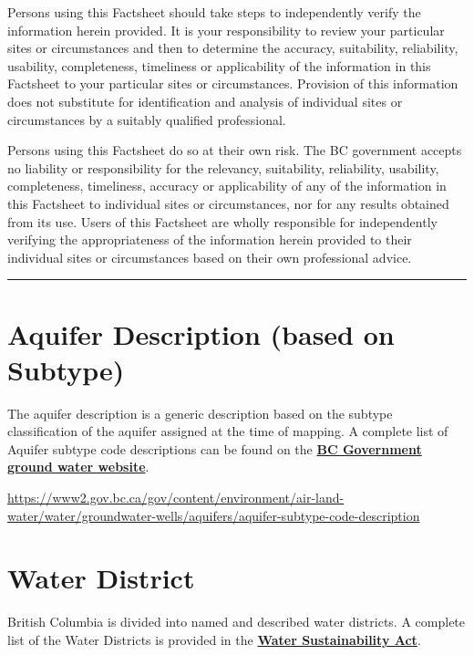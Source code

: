 \documentclass[11pt,]{article}
\let\oldhref\href
\renewcommand{\href}[2]{\oldhref{#1}{\bfseries#2}}
\begin{document}
Persons using this Factsheet should take steps to independently verify
the information herein provided. It is your responsibility to review
your particular sites or circumstances and then to determine the
accuracy, suitability, reliability, usability, completeness, timeliness
or applicability of the information in this Factsheet to your particular
sites or circumstances. Provision of this information does not
substitute for identification and analysis of individual sites or
circumstances by a suitably qualified professional.

Persons using this Factsheet do so at their own risk. The BC government
accepts no liability or responsibility for the relevancy, suitability,
reliability, usability, completeness, timeliness, accuracy or
applicability of any of the information in this Factsheet to individual
sites or circumstances, nor for any results obtained from its use. Users
of this Factsheet are wholly responsible for independently verifying the
appropriateness of the information herein provided to their individual
sites or circumstances based on their own professional advice.

\begin{center}\rule{0.5\linewidth}{\linethickness}\end{center}

\section{Aquifer Description (based on
Subtype)}\label{aquifer-description-based-on-subtype}

The aquifer description is a generic description based on the subtype
classification of the aquifer assigned at the time of mapping. A
complete list of Aquifer subtype code descriptions can be found on the
\href{https://www2.gov.bc.ca/gov/content/environment/air-land-water/water/groundwater-wells/aquifers/aquifer-subtype-code-description}{BC
Government ground water website}.

\url{https://www2.gov.bc.ca/gov/content/environment/air-land-water/water/groundwater-wells/aquifers/aquifer-subtype-code-description}

\section{Water District}\label{water-district}

British Columbia is divided into named and described water districts. A
complete list of the Water Districts is provided in the
\href{http://www.bclaws.ca/civix/document/id/complete/statreg/38_2016}{Water
Sustainability Act}.
\end{document}
